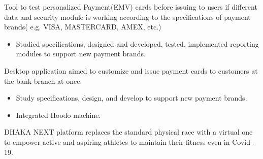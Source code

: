 \documentclass[10pt,a4paper,ragged2e]{altacv}
\begin{document}






    Tool to test personalized Payment(EMV) cards before issuing to users if different data and security module is working according to the specifications of payment brands( e.g. VISA, MASTERCARD, AMEX, etc.)
    \begin{itemize}
        \item Studied specifications, designed and developed, tested, implemented reporting modules to support new payment brands.
    \end{itemize}








    Desktop application aimed to customize and issue payment cards to customers at the bank branch at once.
    \begin{itemize}
        \item Study specifications, design, and develop to support new payment brands.
        \item Integrated Hoodo machine.
    \end{itemize}







    DHAKA NEXT platform replaces the standard physical race with a virtual one to empower active and aspiring athletes to maintain their fitness even in Covid-19.
\end{document}
